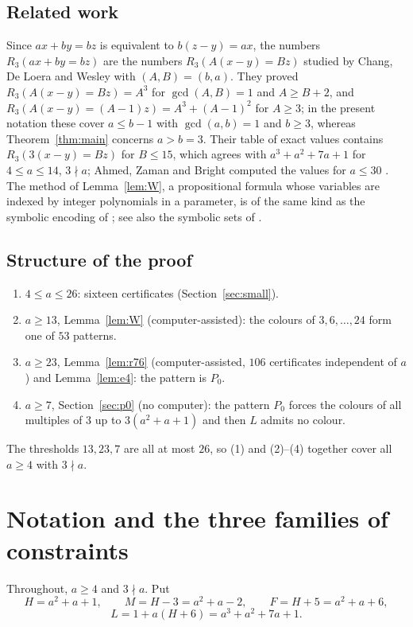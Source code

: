 \documentclass[11pt]{amsart}
\theoremstyle{definition}
\theoremstyle{remark}
\newcommand{\Pz}{P_0}
\begin{document}
\subsection*{Related work}
Since $ax+by=bz$ is equivalent to $b(z-y)=ax$, the numbers $R_3(ax+by=bz)$ are the numbers $R_3(A(x-y)=Bz)$
studied by Chang, De Loera and Wesley \cite{CDW} with $(A,B)=(b,a)$. They proved $R_3(A(x-y)=Bz)=A^3$ for
$\gcd(A,B)=1$ and $A\ge B+2$, and $R_3(A(x-y)=(A-1)z)=A^3+(A-1)^2$ for $A\ge3$; in the present notation these cover
$a\le b-1$ with $\gcd(a,b)=1$ and $b\ge3$, whereas Theorem~\ref{thm:main} concerns $a>b=3$. Their table of exact values contains
$R_3(3(x-y)=Bz)$ for $B\le15$, which agrees with $a^3+a^2+7a+1$ for $4\le a\le14$, $3\nmid a$; Ahmed, Zaman and
Bright computed the values for $a\le30$ \cite{AZB}. The method of Lemma~\ref{lem:W}, a propositional formula
whose variables are indexed by integer polynomials in a parameter, is of the same kind as the symbolic encoding of
\cite[Lemma~4.5]{CDW}; see also the symbolic sets of \cite{AZB}.

\subsection*{Structure of the proof}
\begin{enumerate}
\item $4\le a\le 26$: sixteen certificates (Section~\ref{sec:small}).
\item $a\ge13$, Lemma~\ref{lem:W} (computer-assisted): the colours of $3,6,\dots,24$ form one of $53$ patterns.
\item $a\ge23$, Lemma~\ref{lem:r76} (computer-assisted, $106$ certificates independent of $a$) and
Lemma~\ref{lem:e4}: the pattern is $\Pz$.
\item $a\ge7$, Section~\ref{sec:p0} (no computer): the pattern $\Pz$ forces the colours of all multiples of $3$ up to
$3(a^2+a+1)$ and then $L$ admits no colour.
\end{enumerate}
The thresholds $13,23,7$ are all at most $26$, so (1) and (2)--(4) together cover all $a\ge4$ with $3\nmid a$.

\section{Notation and the three families of constraints}\label{sec:setup}

Throughout, $a\ge4$ and $3\nmid a$. Put
\[H=a^2+a+1,\qquad M=H-3=a^2+a-2,\qquad F=H+5=a^2+a+6,\]
\[L=1+a(H+6)=a^3+a^2+7a+1 .\]
\end{document}
